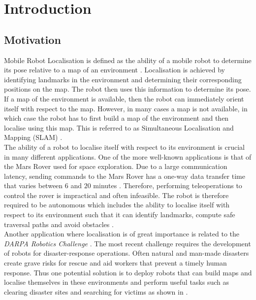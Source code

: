 \chapter{Introduction}
\label{sec:introduction}


\section{Motivation}
\label{sec:motivation}
Mobile Robot Localisation is defined as the ability of a mobile robot to determine its pose relative to a map of an environment \citep{Thrun2002}. Localisation is achieved by identifying landmarks in the environment and determining their corresponding positions on the map. The robot then uses this information to determine its pose. If a map of the environment is available, then the robot can immediately orient itself with respect to the map. However, in many cases a map is not available, in which case the robot has to first build a map of the environment and then localise using this map. This is referred to as Simultaneous Localisation and Mapping (SLAM) \citep{Durrant2006, Bailey2006b}.\\

The ability of a robot to localise itself with respect to its environment is crucial in many different applications. One of the more well-known applications is that of the Mars Rover used for space exploration. Due to a large communication latency, sending commands to the Mars Rover has a one-way data transfer time that varies between $6$ and $20$ minutes \citep{Powell2006}. Therefore, performing teleoperations to control the rover is impractical and often infeasible. The robot is therefore required to be autonomous which includes the ability to localise itself with respect to its environment such that it can identify landmarks, compute safe traversal paths and avoid obstacles \citep{Powell2006}.\\

Another application where localisation is of great importance is related to the \textit{DARPA Robotics Challenge} \citep{darpa2012}. The most recent challenge requires the development of robots for disaster-response operations. Often natural and man-made disasters create grave risks for rescue and aid workers that prevent a timely human response. Thus one potential solution is to deploy robots that can build maps and localise themselves in these environments and perform useful tasks such as clearing disaster sites and searching for victims as shown in .\\   


